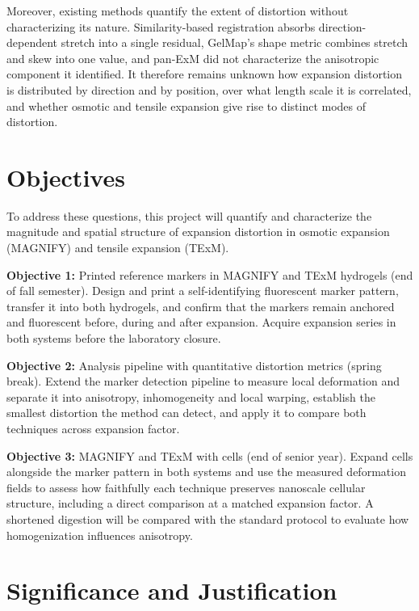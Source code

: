 \documentclass[%
 reprint,
 11pt,
 amsmath,amssymb,
 aps,
]{revtex4-2}
\begin{document}
Moreover, existing methods quantify the extent of distortion without characterizing its nature. Similarity-based registration absorbs direction-dependent stretch into a single residual,\cite{exm,proexm,magnify} GelMap's shape metric combines stretch and skew into one value,\cite{gelmap} and pan-ExM did not characterize the anisotropic component it identified.\cite{panexm} It therefore remains unknown how expansion distortion is distributed by direction and by position, over what length scale it is correlated, and whether osmotic and tensile expansion give rise to distinct modes of distortion.

\section{Objectives}
To address these questions, this project will quantify and characterize the magnitude and spatial structure of expansion distortion in osmotic expansion (MAGNIFY\cite{magnify}) and tensile expansion (TExM\cite{texm}).

\textbf{Objective 1:} Printed reference markers in MAGNIFY and TExM hydrogels (end of fall semester). Design and print a self-identifying fluorescent marker pattern, transfer it into both hydrogels, and confirm that the markers remain anchored and fluorescent before, during and after expansion. Acquire expansion series in both systems before the laboratory closure.

\textbf{Objective 2:} Analysis pipeline with quantitative distortion metrics (spring break). Extend the marker detection pipeline to measure local deformation and separate it into anisotropy, inhomogeneity and local warping, establish the smallest distortion the method can detect, and apply it to compare both techniques across expansion factor.

\textbf{Objective 3:} MAGNIFY and TExM with cells (end of senior year). Expand cells alongside the marker pattern in both systems and use the measured deformation fields to assess how faithfully each technique preserves nanoscale cellular structure, including a direct comparison at a matched expansion factor. A shortened digestion will be compared with the standard protocol to evaluate how homogenization influences anisotropy.

\section{Significance and Justification}
\end{document}

